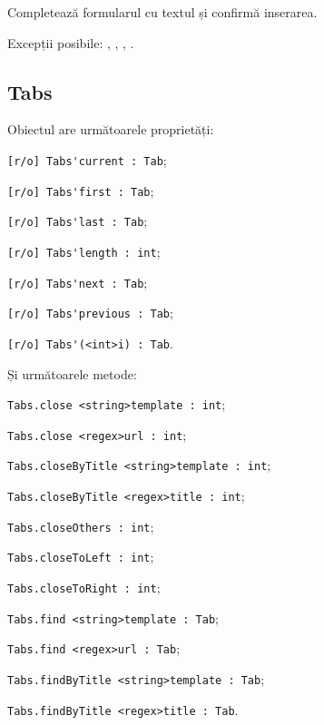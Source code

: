Completează formularul cu textul  și confirmă inserarea.

Excepții posibile: , , , .

\subsection{{\color{orange} Tabs}}

Obiectul \tabs{} are următoarele proprietăți:
\begin{icItems}
	\item \lstinline|[r/o] Tabs'current : Tab|;
	\item \lstinline|[r/o] Tabs'first : Tab|;
	\item \lstinline|[r/o] Tabs'last : Tab|;
	\item \lstinline|[r/o] Tabs'length : int|;
	\item \lstinline|[r/o] Tabs'next : Tab|;
	\item \lstinline|[r/o] Tabs'previous : Tab|;
	\item \lstinline|[r/o] Tabs'(<int>i) : Tab|.
\end{icItems}

Și următoarele metode:
\begin{icItems}
	\item \lstinline|Tabs.close <string>template : int|;
	\item \lstinline|Tabs.close <regex>url : int|;
	\item \lstinline|Tabs.closeByTitle <string>template : int|;
	\item \lstinline|Tabs.closeByTitle <regex>title : int|;
	\item \lstinline|Tabs.closeOthers : int|;
	\item \lstinline|Tabs.closeToLeft : int|;
	\item \lstinline|Tabs.closeToRight : int|;
	\item \lstinline|Tabs.find <string>template : Tab|;
	\item \lstinline|Tabs.find <regex>url : Tab|;
	\item \lstinline|Tabs.findByTitle <string>template : Tab|;
	\item \lstinline|Tabs.findByTitle <regex>title : Tab|.
\end{icItems}

